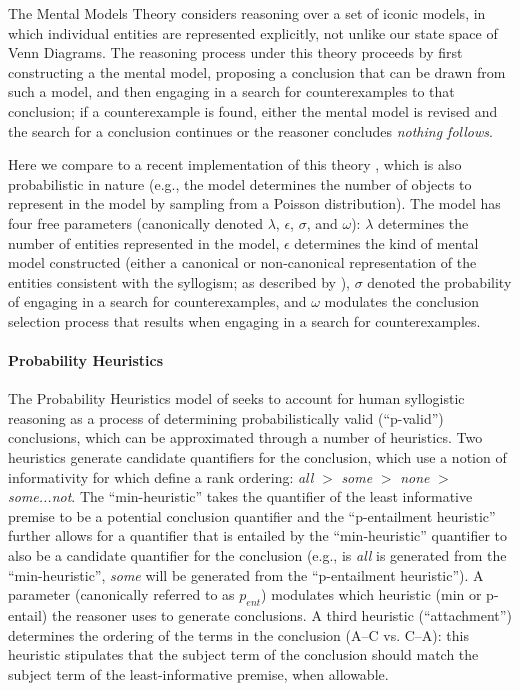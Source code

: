 \documentclass[floatsintext, doc]{apa6}
\begin{document}
The Mental Models Theory considers reasoning over a set of iconic models, in which individual entities are represented explicitly, not unlike our state space of Venn Diagrams. 
The reasoning process under this theory proceeds by first constructing a the mental model, proposing a conclusion that can be drawn from such a model, and then engaging in a search for counterexamples to that conclusion; if a counterexample is found, either the mental model is revised and the search for a conclusion continues or the reasoner concludes \emph{nothing follows}. 

Here we compare to a recent implementation of this theory \cite<the mReasoner model>{khemlani2013processes}, which is also probabilistic in nature (e.g., the model determines the number of objects to represent in the model by sampling  from a Poisson distribution). 
The model has four free parameters (canonically denoted $\lambda$, $\epsilon$, $\sigma$, and $\omega$): 
$\lambda$ determines the number of entities represented in the model, $\epsilon$ determines the kind of mental model constructed (either a canonical or non-canonical representation of the entities consistent with the syllogism; as described by ), $\sigma$ denoted the probability of engaging in a search for counterexamples, and $\omega$ modulates the conclusion selection process that results when engaging in a search for counterexamples.  
\paragraph{Probability Heuristics} 

The Probability Heuristics model of  seeks to account for human syllogistic reasoning as a process of determining probabilistically valid (``p-valid'') conclusions, which can be approximated through a number of heuristics. 
Two heuristics generate candidate quantifiers for the conclusion, which use a notion of informativity for which  define a rank ordering: \emph{all} $>$ \emph{some} $>$ \emph{none} $>$ \emph{some...not}.  
The ``min-heuristic'' takes the quantifier of the least informative premise to be a potential conclusion quantifier and the ``p-entailment heuristic'' further allows for a quantifier that is entailed by the ``min-heuristic'' quantifier to also be a candidate quantifier for the conclusion (e.g., is \emph{all} is generated from the ``min-heuristic'', \emph{some} will be generated from the ``p-entailment heuristic''). 
A parameter (canonically referred to as $p_{ent}$) modulates which heuristic (min or p-entail) the reasoner uses to generate conclusions. 
A third heuristic (``attachment'') determines the ordering of the terms in the conclusion (A--C vs. C--A): this heuristic stipulates that the subject term of the conclusion should match the subject term of the least-informative premise, when allowable. 
\end{document}
